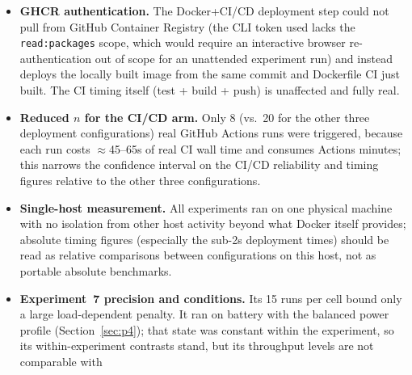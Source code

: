 \documentclass[conference]{IEEEtran}
\begin{document}
\begin{itemize}
\texttt{overlayfs}, \texttt{io.containerd.snapshotter.v1}), not the classic
\texttt{overlay2} layout. cAdvisor v0.49.1 logged that it could not identify the
read-write layer of any container and attached no container name or image label, so
Prometheus queries filtered by container returned nothing. Three consequences follow.
The detection experiments use the application's own Prometheus metrics, so their
detection times are for an application-level signal, not for container-level CPU. The
per-container CPU and memory figures come from \texttt{docker stats} and cgroup
counters, not from the monitoring stack. cAdvisor still ran and was scraped in every
monitored case, so its CPU is included in the overhead figures, but we did not measure
the cost of a cAdvisor that resolves labels. We tested one cAdvisor version with one
storage driver; this is not a statement about cAdvisor in general, and other versions
or the \texttt{overlay2} driver may behave differently.
\item \textbf{GHCR authentication.} The Docker+CI/CD deployment step could
not pull from GitHub Container Registry (the CLI token used lacks the
\texttt{read:packages} scope, which would require an interactive browser
re-authentication out of scope for an unattended experiment run) and instead
deploys the locally built image from the same commit and Dockerfile CI just
built. The CI timing itself (test + build + push) is unaffected and fully
real.
\item \textbf{Reduced $n$ for the CI/CD arm.} Only 8 (vs.\ 20 for the other
three deployment configurations) real GitHub Actions runs were triggered,
because each run costs $\approx$45--65s of real CI wall time and consumes
Actions minutes; this narrows the confidence interval on the CI/CD reliability
and timing figures relative to the other three configurations.
\item \textbf{Single-host measurement.} All experiments ran on one physical
machine with no isolation from other host activity beyond what Docker itself
provides; absolute timing figures (especially the sub-2s deployment times)
should be read as relative comparisons between configurations on this host,
not as portable absolute benchmarks.
\item \textbf{Experiment~7 precision and conditions.} Its 15 runs per cell bound only
a large load-dependent penalty. It ran on battery with the balanced power profile
(Section~\ref{sec:p4}); that state was constant within the experiment, so its
within-experiment contrasts stand, but its throughput levels are not comparable with

\end{itemize}
\end{document}
